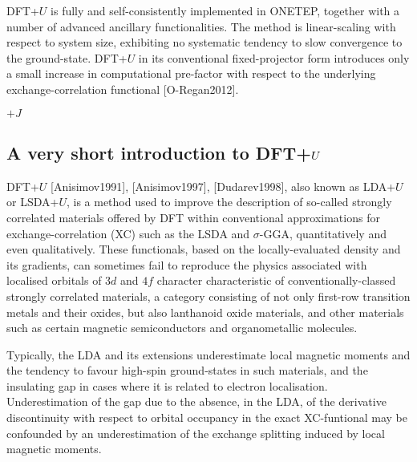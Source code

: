 \documentclass[letterpaper,10pt,english]{sphinxmanual}
\begin{document}
DFT+\(U\) is fully and self-consistently implemented in ONETEP,
together with a number of advanced ancillary functionalities. The method
is linear-scaling with respect to system size, exhibiting no systematic
tendency to slow convergence to the ground-state. DFT+\(U\) in its
conventional fixed-projector form introduces only a small increase in
computational pre-factor with respect to the underlying
exchange-correlation functional {[}O-Regan2012{]}.

 \(+J\) 


\subsection{A very short introduction to DFT+\protect\(U\protect\)}
\label{\detokenize{ONETEP_DFT+U_README:a-very-short-introduction-to-dft}}
DFT+\(U\) {[}Anisimov1991{]}, {[}Anisimov1997{]}, {[}Dudarev1998{]}, also
known as LDA+\(U\) or LSDA+\(U\), is a method used to
improve the description of so-called strongly correlated materials
offered by DFT within conventional approximations for
exchange-correlation (XC) such as the LSDA and \(\sigma\)-GGA,
quantitatively and even qualitatively. These functionals, based on the
locally-evaluated density and its gradients, can sometimes fail to
reproduce the physics associated with localised orbitals of \(3d\)
and \(4f\) character characteristic of conventionally-classed
strongly correlated materials, a category consisting of not only
first-row transition metals and their oxides, but also lanthanoid oxide
materials, and other materials such as certain magnetic semiconductors
and organometallic molecules.

Typically, the LDA and its extensions underestimate local magnetic
moments and the tendency to favour high-spin ground-states in such
materials, and the insulating gap in cases where it is related to
electron localisation. Underestimation of the gap due to the absence, in
the LDA, of the derivative discontinuity with respect to orbital
occupancy in the exact XC-funtional may be confounded by an
underestimation of the exchange splitting induced by local magnetic
moments.
\end{document}

